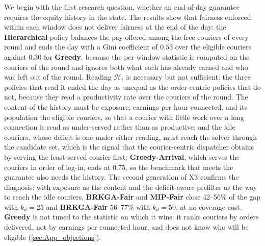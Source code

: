\documentclass[a4paper,11pt,review,3p,authoryear]{elsarticle}
\newcommand{\Hist}{\mathcal{H}}
\begin{document}
We begin with the first research question, whether an end-of-day guarantee requires the equity history in the state. The results show that fairness enforced within each window does not deliver fairness at the end of the day: the \textbf{Hierarchical} policy balances the pay offered among the free couriers of every round and ends the day with a Gini coefficient of $0.53$ over the eligible couriers against $0.30$ for \textbf{Greedy}, because the per-window statistic is computed on the couriers of the round and ignores both what each has already earned and who was left out of the round. Reading $\Hist_t$ is necessary but not sufficient: the three policies that read it ended the day as unequal as the order-centric policies that do not, because they read a productivity rate over the couriers of the round. The content of the history must be exposure, earnings per hour connected, and its population the eligible couriers, so that a courier with little work over a long connection is read as under-served rather than as productive; and the idle couriers, whose deficit is one under either reading, must reach the solver through the candidate set, which is the signal that the courier-centric dispatcher obtains by serving the least-served courier first; \textbf{Greedy-Arrival}, which serves the couriers in order of log-in, ends at $0.75$, so the benchmark that meets the guarantee also needs the history. The second generation of X3 confirms the diagnosis: with exposure as the content and the deficit-aware prefilter as the way to reach the idle couriers, \textbf{BRKGA-Fair} and \textbf{MIP-Fair} close 42--56\% of the gap with $k_d = 25$ and \textbf{BRKGA-Fair} 56--77\% with $k_d = 50$, at no coverage cost. \textbf{Greedy} is not tuned to the statistic on which it wins: it ranks couriers by orders delivered, not by earnings per connected hour, and does not know who will be eligible (\ref{sec:App_objections}).
\end{document}

